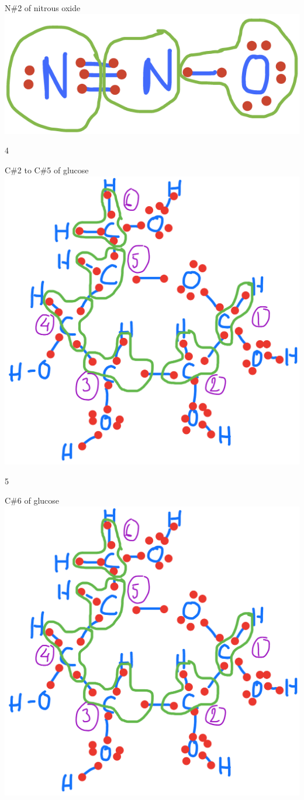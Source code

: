 \documentclass[]{book}
\theoremstyle{definition}
\theoremstyle{definition}
\theoremstyle{definition}
\theoremstyle{remark}
\begin{document}
N\#2 of nitrous oxide~\includegraphics{pictures/ElecAlloc_N2O.png}

4

C\#2 to C\#5 of glucose~\includegraphics{pictures/ElecAlloc_glucose.png}

5

C\#6 of glucose~\includegraphics{pictures/ElecAlloc_glucose.png}
\end{document}
